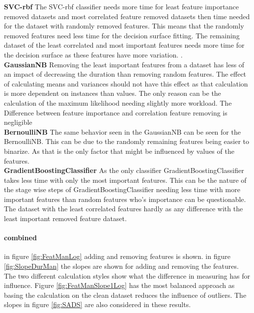 \documentclass[a4paper,10pt]{article}
\begin{document}
\textbf{SVC-rbf} The SVC-rbf classifier needs more time for least feature importance removed datasets and most correlated feature removed datasets then time needed for the dataset with randomly removed features.  This means that the randomly removed features need less time for the decision surface fitting. The remaining dataset of the least correlated and most important features needs more time for the decision surface as these features have more variation.  .
 \\

\textbf{GaussianNB} Removing the least important features from a dataset has less of an impact of decreasing the duration than removing random features. The effect of calculating means and variances should not have this effect as that calculation is more dependent on instances than values. The only reason can be the calculation of the maximum likelihood needing slightly more workload. The Difference between feature importance and correlation feature removing is negligible \\

\textbf{BernoulliNB} The same behavior seen in the GaussianNB can be seen for the BernoulliNB. This can be due to the randomly remaining features being easier to binarize. As that is the only factor that might be influenced by values of the features. \\

\textbf{GradientBoostingClassifier} As the only classifier GradientBoostingClassifier takes less time with only the most important features. This can be the nature of the stage wise steps of GradientBoostingClassifier needing less time with more important features than random features who's importance can be questionable. The dataset with the least correlated features hardly as any difference with the least important removed feature dataset.\\


\paragraph{combined}
in figure \ref{fig:FeatManLog} adding and removing features is shown.
in figure \ref{fig:SlopeDurMan} the slopes are shown for adding and removing the features. The two different calculation styles show what the difference in measuring has for influence. Figure \ref{fig:FeatManSlope1Log} has the most balanced approach as basing the calculation on the clean dataset reduces the influence of outliers. The slopes in figure \ref{fig:SADS} are also considered in these results.
\end{document}
